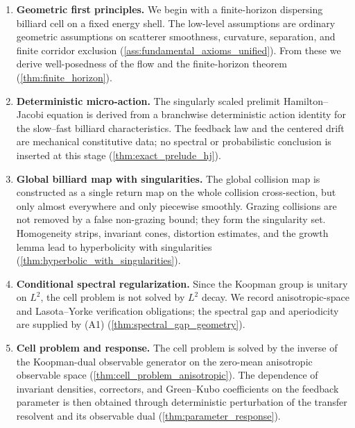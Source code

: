 \documentclass[12pt, letterpaper]{amsart}
\theoremstyle{plain}
\theoremstyle{definition}
\theoremstyle{remark}
\begin{document}
\begin{enumerate}[wide, labelindent=0pt]
    \item[\textbf{Section \ref{sec:micro_framework}:}] \textbf{Geometric first principles.}  We begin with a finite-horizon dispersing billiard cell on a fixed energy shell.  The low-level assumptions are ordinary geometric assumptions on scatterer smoothness, curvature, separation, and finite corridor exclusion (\cref{ass:fundamental_axioms_unified}).  From these we derive well-posedness of the flow and the finite-horizon theorem (\cref{thm:finite_horizon}).

    \item[\textbf{Section \ref{sec:first_principles_prelimit}:}] \textbf{Deterministic micro-action.}  The singularly scaled prelimit Hamilton--Jacobi equation is derived from a branchwise deterministic action identity for the slow--fast billiard characteristics.  The feedback law and the centered drift are mechanical constitutive data; no spectral or probabilistic conclusion is inserted at this stage (\cref{thm:exact_prelude_hj}).

    \item[\textbf{Section \ref{sec:singular_hyperbolicity}:}] \textbf{Global billiard map with singularities.}  The global collision map is constructed as a single return map on the whole collision cross-section, but only almost everywhere and only piecewise smoothly.  Grazing collisions are not removed by a false non-grazing bound; they form the singularity set.  Homogeneity strips, invariant cones, distortion estimates, and the growth lemma lead to hyperbolicity with singularities (\cref{thm:hyperbolic_with_singularities}).

    \item[\textbf{Section \ref{sec:transfer_singular}:}] \textbf{Conditional spectral regularization.} Since the Koopman group is unitary on $L^2$, the cell problem is not solved by $L^2$ decay. We record anisotropic-space and Lasota--Yorke verification obligations; the spectral gap and aperiodicity are supplied by \textup{(A1)} (\cref{thm:spectral_gap_geometry}).

    \item[\textbf{Section \ref{sec:cell_anisotropic}:}] \textbf{Cell problem and response.}  The cell problem is solved by the inverse of the Koopman-dual observable generator on the zero-mean anisotropic observable space (\cref{thm:cell_problem_anisotropic}).  The dependence of invariant densities, correctors, and Green--Kubo coefficients on the feedback parameter is then obtained through deterministic perturbation of the transfer resolvent and its observable dual (\cref{thm:parameter_response}).


\end{enumerate}
\end{document}
